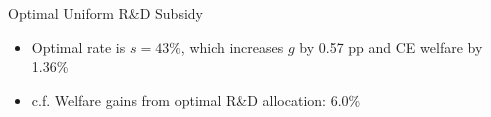 \documentclass[
  10pt,
  aspectratio=169,   %
]{beamer}
\theoremstyle{plain}
\begin{document}
\begin{frame}{Optimal Uniform R\&D Subsidy}
  \begin{center}
    \begin{figure}
      \centering
      \setcounter{subfigure}{0}
    \end{figure}
  \end{center}
  \begin{itemize}
    \item Optimal rate is $s=43\%$, which increases $g$ by 0.57 pp and CE welfare by 1.36\%
    \item c.f. Welfare gains from optimal R\&D allocation: 6.0\%
  \end{itemize}
\end{frame}
\end{document}
